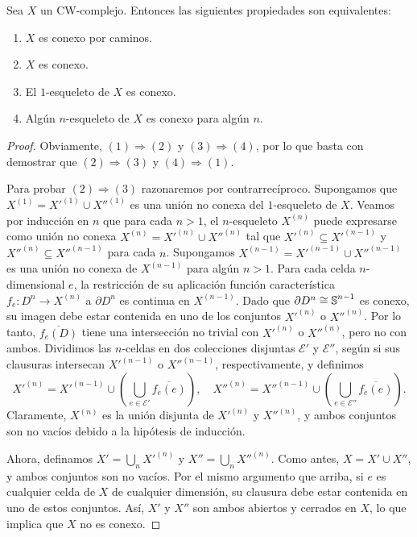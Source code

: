 \begin{teorema}
	\label{teo:cw-conexion}
	Sea $X$ un CW-complejo. Entonces las siguientes propiedades son equivalentes:
	\begin{enumerate}
		\item $X$ es conexo por caminos.
		
		\item $X$ es conexo.
		
		\item El $1$-esqueleto de $X$ es conexo.
		
		\item Algún $n$-esqueleto de $X$ es conexo para algún $n$.
	\end{enumerate}
\end{teorema}
\begin{proof}
	Obviamente, $(1) \Rightarrow (2)$ y $(3) \Rightarrow (4)$, por lo que basta con
	demostrar que $(2) \Rightarrow (3)$ y $(4) \Rightarrow (1)$.
	
	Para probar $(2) \Rightarrow (3)$ razonaremos por contrarrecíproco. Supongamos
	que $X^{(1)}= X'^{(1)}\cup X''^{(1)}$ es una unión no conexa del $1$-esqueleto
	de $X$. Veamos por inducción en $n$ que para cada $n > 1$, el $n$-esqueleto
	$X^{(n)}$ puede expresarse como unión no conexa
	$X^{(n)}= X'^{(n)}\cup X''^{(n)}$ tal que $X'^{(n)}\subseteq X'^{(n-1)}$ y
	$X''^{(n)}\subseteq X''^{(n-1)}$ para cada $n$. Supongamos $X^{(n-1)}= X'^{(n-1)}
	\cup X''^{(n-1)}$ es una unión no conexa de $X^{(n-1)}$ para algún $n > 1$.
	Para cada celda $n$-dimensional $e$, la restricción de su aplicación función característica
	$f_{e} \colon D^{n} \to X^{(n)}$ a $\partial D^{n}$ es continua en $X^{(n-1)}$.
	Dado que $\partial D^{n} \cong \operatorname{\mathbb{S}}^{n-1}$ es conexo, su imagen debe estar contenida
	en uno de los conjuntos $X'^{(n)}$ o $X''^{(n)}$. Por lo tanto, $\overline{f_e(D)}$
	tiene una intersección no trivial con $X'^{(n)}$ o $X''^{(n)}$, pero no con
	ambos. Dividimos las $n$-celdas en dos colecciones disjuntas $\mathcal{E}'$ y $\mathcal{E}
	''$, según si sus clausuras intersecan $X'^{(n-1)}$ o $X''^{(n-1)}$, respectivamente,
	y definimos
	\[
	X'^{(n)}= X'^{(n-1)}\cup \left(\bigcup_{e \in \mathcal{E}'}\overline{f_e(e)}\right
	),\quad X''^{(n)}= X''^{(n-1)}\cup \left(\bigcup_{e \in \mathcal{E}''}\overline
	{f_e(e)}\right).
	\]
	Claramente, $X^{(n)}$ es la unión disjunta de $X'^{(n)}$ y $X''^{(n)}$, y
	ambos conjuntos son no vacíos debido a la hipótesis de inducción.
	
	Ahora, definamos $X' = \bigcup_{n} X'^{(n)}$ y $X'' = \bigcup_{n} X''^{(n)}$.
	Como antes, $X = X' \cup X''$, y ambos conjuntos son no vacíos. Por el mismo argumento
	que arriba, si $e$ es cualquier celda de $X$ de cualquier dimensión, su clausura
	debe estar contenida en uno de estos conjuntos. Así, $X'$ y $X''$ son ambos abiertos
	y cerrados en $X$, lo que implica que $X$ no es conexo.
	

\end{proof}
